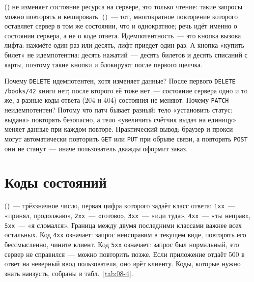  () не изменяет состояние ресурса на сервере,
это только чтение: такие запросы можно повторять и кешировать.
 ()~--- тот, многократное повторение
которого оставляет сервер в том же состоянии, что и однократное; речь идёт
именно о состоянии сервера, а не о коде ответа. Идемпотентность~--- это кнопка
вызова лифта: нажмёте один раз или десять, лифт приедет один раз. А кнопка
«купить билет» не идемпотентна: десять нажатий~--- десять билетов и десять
списаний с карты, поэтому такие кнопки и блокируют после первого щелчка.

Почему \texttt{DELETE} идемпотентен, хотя изменяет данные? После первого
\texttt{DELETE /books/42} книги нет; после второго её тоже нет~--- состояние
сервера одно и то же, а разные коды ответа (204 и 404) состояния не меняют.
Почему \texttt{PATCH} неидемпотентен? Потому что патч бывает разный: тело
«установить статус: выдана» повторять безопасно, а тело «увеличить счётчик
выдач на единицу» меняет данные при каждом повторе. Практический вывод: браузер
и прокси могут автоматически повторить \texttt{GET} или \texttt{PUT} при обрыве
связи, а повторять \texttt{POST} они не станут~--- иначе пользователь дважды
оформит заказ.

\section{Коды состояний}

 ()~--- трёхзначное число, первая цифра
которого задаёт класс ответа: \texttt{1xx}~--- «принял, продолжаю»,
\texttt{2xx}~--- «готово», \texttt{3xx}~--- «иди туда», \texttt{4xx}~--- «ты
неправ», \texttt{5xx}~--- «я сломался». Граница между двумя последними классами
важнее всех остальных. Код \texttt{4xx} означает: запрос неисправим в текущем
виде, повторять его бессмысленно, чините клиент. Код \texttt{5xx} означает:
запрос был нормальный, это сервер не справился~--- можно повторить позже. Если
приложение отдаёт 500 в ответ на неверный ввод пользователя, оно врёт клиенту.
Коды, которые нужно знать наизусть, собраны в табл.~\ref{tab:08-4}.

